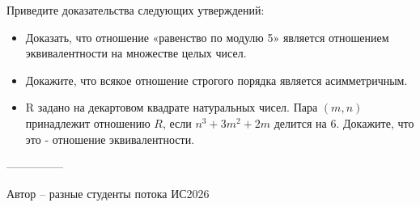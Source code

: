 \question
Приведите доказательства следующих утверждений:
\begin{itemize}
    \item Доказать, что отношение «равенство по модулю 5» является отношением эквивалентности на множестве целых чисел.
    \item Докажите, что всякое отношение строгого порядка является асимметричным.
    \item R задано на декартовом квадрате натуральных чисел. Пара $(m,n)$ принадлежит отношению $R$, если $n^3 + 3m^2 + 2m$ делится на 6. Докажите, что это - отношение эквивалентности.
\end{itemize}

---------------

Автор -- разные студенты потока ИС2026